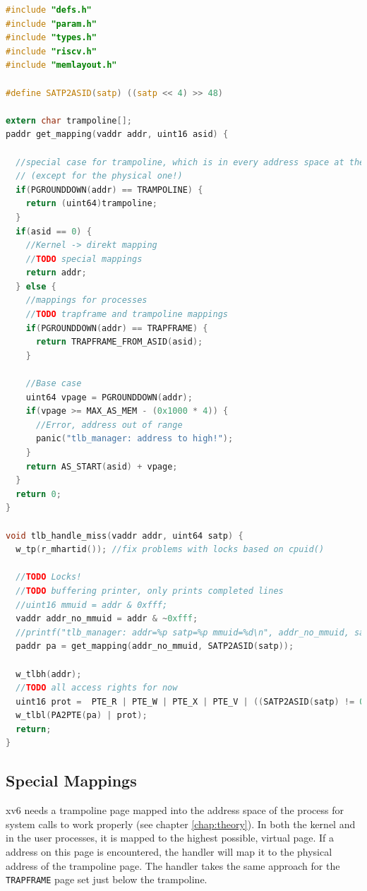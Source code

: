 \begin{lstlisting}[language=c,float=h!,
    label={lst:handler}]
#include "defs.h"
#include "param.h"
#include "types.h"
#include "riscv.h"
#include "memlayout.h"

#define SATP2ASID(satp) ((satp << 4) >> 48)

extern char trampoline[];
paddr get_mapping(vaddr addr, uint16 asid) {

  //special case for trampoline, which is in every address space at the same address
  // (except for the physical one!)
  if(PGROUNDDOWN(addr) == TRAMPOLINE) {
    return (uint64)trampoline;
  }
  if(asid == 0) {
    //Kernel -> direkt mapping
    //TODO special mappings
    return addr;
  } else {
    //mappings for processes
    //TODO trapframe and trampoline mappings
    if(PGROUNDDOWN(addr) == TRAPFRAME) {
      return TRAPFRAME_FROM_ASID(asid);
    }

    //Base case
    uint64 vpage = PGROUNDDOWN(addr);
    if(vpage >= MAX_AS_MEM - (0x1000 * 4)) {
      //Error, address out of range
      panic("tlb_manager: address to high!");
    }
    return AS_START(asid) + vpage;
  }
  return 0;
}

void tlb_handle_miss(vaddr addr, uint64 satp) {
  w_tp(r_mhartid()); //fix problems with locks based on cpuid()

  //TODO Locks!
  //TODO buffering printer, only prints completed lines
  //uint16 mmuid = addr & 0xfff;
  vaddr addr_no_mmuid = addr & ~0xfff;
  //printf("tlb_manager: addr=%p satp=%p mmuid=%d\n", addr_no_mmuid, satp, mmuid);
  paddr pa = get_mapping(addr_no_mmuid, SATP2ASID(satp));

  w_tlbh(addr);
  //TODO all access rights for now
  uint16 prot =  PTE_R | PTE_W | PTE_X | PTE_V | ((SATP2ASID(satp) != 0) ? PTE_U : 0);
  w_tlbl(PA2PTE(pa) | prot);
  return;
}
\end{lstlisting}


\subsection{Special Mappings}
xv6 needs a trampoline page mapped into the address space of the process for system calls to work properly (see chapter \ref{chap:theory}).
In both the kernel and in the user processes, it is mapped to the highest possible, virtual page.
If a address on this page is encountered, the handler will map it to the physical address of the trampoline page.
The handler takes the same approach for the \texttt{TRAPFRAME} page set just below the trampoline.

